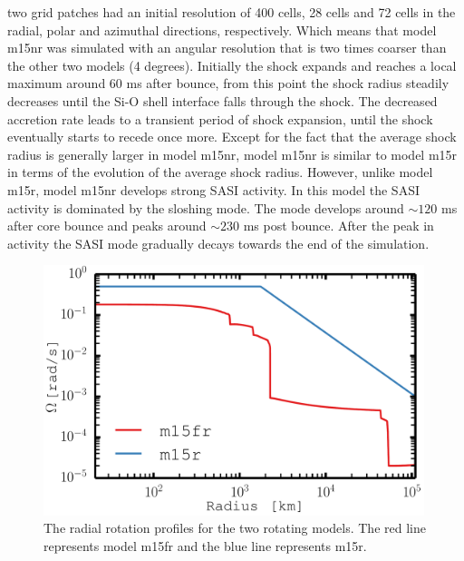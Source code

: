 \begin{itemize}
two grid patches had an initial resolution of 400 cells, 28 cells and 72 cells in the radial, polar and
azimuthal directions, respectively. Which means that model m15nr was simulated with an angular resolution that is
two times coarser than the other two models (4 degrees). Initially the shock expands and reaches a local maximum around $60$ ms after bounce,
from this point the shock radius steadily decreases until the Si-O shell interface falls through the shock. The decreased accretion rate
leads to a transient period of shock expansion, until the shock eventually starts to recede once more. Except for the fact that
the average shock radius is generally larger in model m15nr, model m15nr is similar to model m15r in terms of the evolution of the average shock
radius. However, unlike model m15r, model m15nr develops strong SASI activity. In this model the SASI activity is dominated by the sloshing mode.
The mode develops around $\sim 120$ ms after core bounce and peaks around $\sim 230$ ms post bounce. After the peak in activity 
the SASI mode gradually decays towards the end of the simulation.   
\end{itemize}
\begin{figure}[H!]           
\centering                            
\includegraphics[width=0.99\textwidth]{./images/paper2/rot.pdf}
\caption{The radial rotation profiles for the two rotating models. The red line represents model 
m15fr and the blue line represents m15r. \label{figp2:rot}}
\end{figure}
